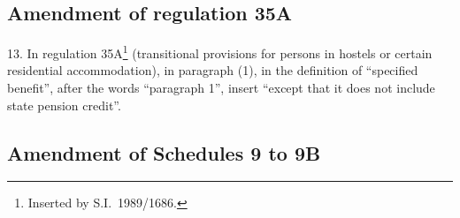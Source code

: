 \documentclass[12pt,a4paper]{article}
\begin{document}
\subsection[13. Amendment of regulation 35A]{Amendment of regulation 35A}

13.  In regulation 35A\footnote{Inserted by S.I.\ 1989/1686.} (transitional provisions for persons in hostels or certain residential accommodation), in paragraph (1), in the definition of “specified benefit”, after the words “paragraph 1”, insert “except that it does not include state pension credit”.

\subsection[14. Amendment of Schedules 9 to 9B]{Amendment of Schedules 9 to 9B}
\end{document}

